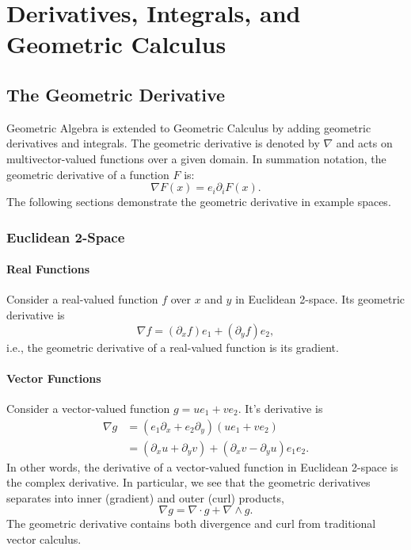 \chapter{Derivatives, Integrals, and Geometric Calculus}

	\section{The Geometric Derivative}
	
	Geometric Algebra is extended to Geometric Calculus by adding geometric derivatives and integrals. The geometric derivative is denoted by $\nabla$ and acts on multivector-valued functions over a given domain. In summation notation, the geometric derivative of a function $F$ is:	
	\[
	\nabla F\left( x\right)  = e_i\partial_i F \left( x\right).
	\]	
	The following sections demonstrate the geometric derivative in example spaces.
	
	\subsection{Euclidean 2-Space}
	
	\subsubsection{Real Functions}
	
	Consider a real-valued function $f$ over $x$ and $y$ in Euclidean 2-space. Its geometric derivative is	
	\[
	\nabla f = \left( \partial_x f\right) e_1  + \left( \partial_y f\right) e_2,
	\]	
	i.e., the geometric derivative of a real-valued function is its gradient.
	
	\subsubsection{Vector Functions}
	
	Consider a vector-valued function $g = u e_1 + ve_2.$ It's derivative is
	\begin{align*}
	\nabla g & = \left(e_1\partial_x + e_2\partial_y \right) \left(ue_1 + ve_2 \right) \\
	 & = \left( \partial_x u + \partial_y v\right) + \left( \partial_x v - \partial_y u\right)e_1e_2. 
	\end{align*}	
	In other words, the derivative of a vector-valued function in Euclidean 2-space is the complex derivative. In particular, we see that the geometric derivatives separates into inner (gradient) and outer (curl) products,
	\[
	\nabla g = \nabla \cdot g + \nabla \wedge g.
	\]
	The geometric derivative contains both divergence and curl from traditional vector calculus.
	
